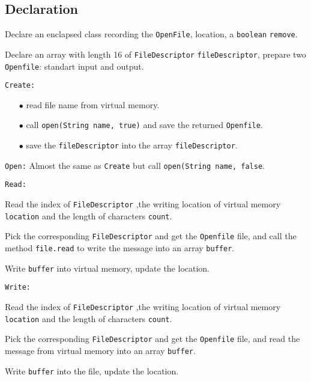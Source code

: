 \documentclass{article}
\begin{document}
\subsection{Declaration}
\begin{compactitem}
\item Declare an enclapsed  class recording the \texttt{OpenFile}, location, a \texttt{boolean} \texttt{remove}.
\item Declare an array with length 16 of \texttt{FileDescriptor} \texttt{fileDescriptor}, prepare two \texttt{Openfile}: standart input and output.
\item \texttt{Create:} 
	\begin{enumerate}
		\item[$\bullet$] read file name from virtual memory.
		\item[$\bullet$] call \texttt{open(String name, true)} and save the returned \texttt{Openfile}.
		\item[$\bullet$] save the \texttt{fileDescriptor} into the array \texttt{fileDescriptor}.
	\end{enumerate}
\item \texttt{Open:} Almost the same as \texttt{Create} but call \texttt{open(String name, false}.
\item \texttt{Read:}
	\begin{compactitem}
		\item Read the index of \texttt{FileDescriptor} ,the writing location of virtual memory \texttt{location} and the length of characters \texttt{count}.
		\item Pick the corresponding \texttt{FileDescriptor} and get the \texttt{Openfile} file, and call the method \texttt{file.read} to write the message into an array \texttt{buffer}.
		\item Write \texttt{buffer} into virtual memory, update the location.
	\end{compactitem}
\item \texttt{Write:}
	\begin{compactitem}
		\item Read the index of \texttt{FileDescriptor} ,the writing location of virtual memory \texttt{location} and the length of characters \texttt{count}.
		\item Pick the corresponding \texttt{FileDescriptor} and get the \texttt{Openfile} file, and read the message from virtual memory into an array \texttt{buffer}.
		\item Write \texttt{buffer} into the file, update the location.

\end{compactitem}
\end{compactitem}
\end{document}
